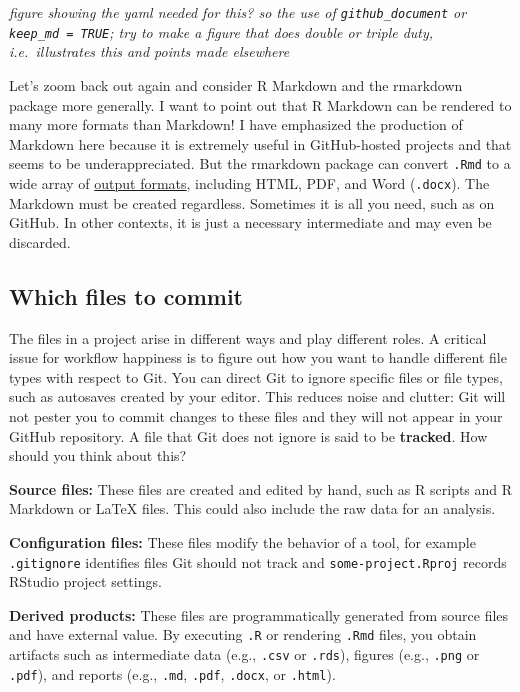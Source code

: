 \documentclass[12pt]{article}
\begin{document}
\emph{figure showing the yaml needed for this? so the use of
\texttt{github\_document} or \texttt{keep\_md\ =\ TRUE}; try to make a
figure that does double or triple duty, i.e.~illustrates this and points
made elsewhere}

Let's zoom back out again and consider R Markdown and the rmarkdown
package more generally. I want to point out that R Markdown can be
rendered to many more formats than Markdown! I have emphasized the
production of Markdown here because it is extremely useful in
GitHub-hosted projects and that seems to be underappreciated. But the
rmarkdown package can convert \texttt{.Rmd} to a wide array of
\href{http://rmarkdown.rstudio.com/lesson-9.html}{output formats},
including HTML, PDF, and Word (\texttt{.docx}). The Markdown must be
created regardless. Sometimes it is all you need, such as on GitHub. In
other contexts, it is just a necessary intermediate and may even be
discarded.

\subsection{Which files to commit}\label{which-files-to-commit}

The files in a project arise in different ways and play different roles.
A critical issue for workflow happiness is to figure out how you want to
handle different file types with respect to Git. You can direct Git to
ignore specific files or file types, such as autosaves created by your
editor. This reduces noise and clutter: Git will not pester you to
commit changes to these files and they will not appear in your GitHub
repository. A file that Git does not ignore is said to be
\textbf{tracked}. How should you think about this?

\textbf{Source files:} These files are created and edited by hand, such
as R scripts and R Markdown or LaTeX files. This could also include the
raw data for an analysis.

\textbf{Configuration files:} These files modify the behavior of a tool,
for example \texttt{.gitignore} identifies files Git should not track
and \texttt{some-project.Rproj} records RStudio project settings.

\textbf{Derived products:} These files are programmatically generated
from source files and have external value. By executing \texttt{.R} or
rendering \texttt{.Rmd} files, you obtain artifacts such as intermediate
data (e.g., \texttt{.csv} or \texttt{.rds}), figures (e.g.,
\texttt{.png} or \texttt{.pdf}), and reports (e.g., \texttt{.md},
\texttt{.pdf}, \texttt{.docx}, or \texttt{.html}).
\end{document}
